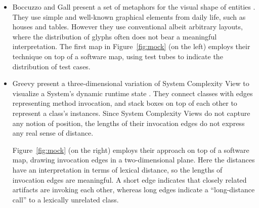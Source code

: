 \begin{itemize}

\item Boccuzzo and Gall present a set of metaphors for the visual shape of entities \cite{Bocc07a}. They use simple and well-known graphical elements from daily life, such as houses and tables. However they use conventional albeit arbitrary layouts, where the distribution of glyphs often does not bear a meaningful interpretation. The first map in Figure~\ref{fig:mock} (on the left) employs their technique on top of a software map, using test tubes to indicate the distribution of test cases.

\item Greevy \etal present a three-dimensional variation of System Complexity View to visualize a System's dynamic runtime state \cite{Gree05d}. They connect classes with edges representing method invocation, and stack boxes on top of each other to represent a class's instances.
Since System Complexity Views do not capture any notion of position, the lengths of their invocation edges do not express any real sense of distance.

Figure~\ref{fig:mock} (on the right) employs their approach on top of a software map, drawing invocation edges in a two-dimensional plane.
Here the distances have an interpretation in terms of lexical distance, so the lengths of invocation edges are meaningful.
A short edge indicates that closely related artifacts are invoking each other, whereas long edges indicate a ``long-distance call'' to a lexically unrelated class.

\end{itemize}

